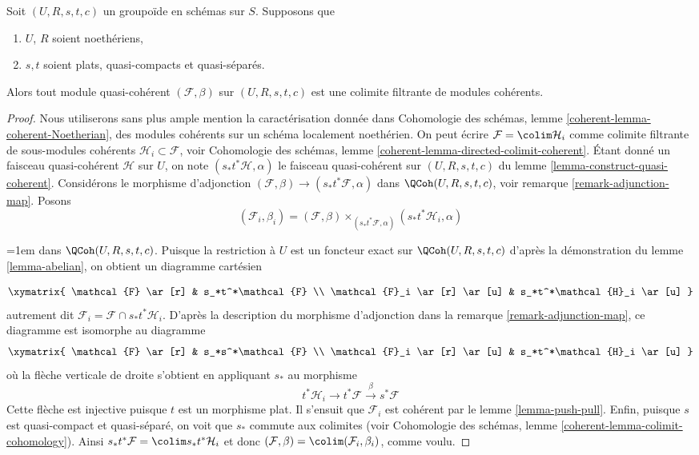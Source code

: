 \begin{lemma}
\label{lemma-colimit-coherent}
Soit $(U, R, s, t, c)$ un groupoïde en schémas sur $S$.
Supposons que
\begin{enumerate}
\item $U$, $R$ soient noethériens,
\item $s, t$ soient plats, quasi-compacts et quasi-séparés.
\end{enumerate}
Alors tout module quasi-cohérent $(\mathcal{F}, \beta)$ sur $(U, R, s, t, c)$
est une colimite filtrante de modules cohérents.
\end{lemma}

\begin{proof}
Nous utiliserons sans plus ample mention la caractérisation donnée dans
Cohomologie des schémas, lemme \ref{coherent-lemma-coherent-Noetherian}, des
modules cohérents sur un schéma localement noethérien. On peut écrire
$\mathcal{F} = \colim \mathcal{H}_i$ comme colimite filtrante
de sous-modules cohérents $\mathcal{H}_i \subset \mathcal{F}$, voir
Cohomologie des schémas, lemme \ref{coherent-lemma-directed-colimit-coherent}.
Étant donné un faisceau quasi-cohérent $\mathcal{H}$ sur $U$, on note
$(s_*t^*\mathcal{H}, \alpha)$ le faisceau quasi-cohérent sur $(U, R, s, t, c)$ du
lemme \ref{lemma-construct-quasi-coherent}. Considérons le morphisme d'adjonction
$(\mathcal{F}, \beta) \to (s_*t^*\mathcal{F}, \alpha)$ dans
$\QCoh(U, R, s, t, c)$, voir remarque \ref{remark-adjunction-map}.
Posons
$$
(\mathcal{F}_i, \beta_i) =
(\mathcal{F}, \beta)
\times_{(s_*t^*\mathcal{F}, \alpha)}
(s_*t^*\mathcal{H}_i, \alpha)
$$
{\emergencystretch=1em dans $\QCoh(U,\allowbreak R,\allowbreak s,\allowbreak t,\allowbreak c)$. Puisque la restriction à $U$ est un foncteur exact
sur $\QCoh(U,\allowbreak R,\allowbreak s,\allowbreak t,\allowbreak c)$ d'après la démonstration du lemme \ref{lemma-abelian},
on obtient un diagramme cartésien\par}
$$
\xymatrix{
\mathcal{F} \ar[r] & s_*t^*\mathcal{F} \\
\mathcal{F}_i \ar[r] \ar[u] & s_*t^*\mathcal{H}_i \ar[u]
}
$$
autrement dit $\mathcal{F}_i = \mathcal{F} \cap s_*t^*\mathcal{H}_i$.
D'après la description du morphisme d'adjonction dans la remarque \ref{remark-adjunction-map},
ce diagramme est isomorphe au diagramme
$$
\xymatrix{
\mathcal{F} \ar[r] & s_*s^*\mathcal{F} \\
\mathcal{F}_i \ar[r] \ar[u] & s_*t^*\mathcal{H}_i \ar[u]
}
$$
où la flèche verticale de droite s'obtient en appliquant $s_*$ au morphisme
$$
t^*\mathcal{H}_i \to t^*\mathcal{F} \xrightarrow{\beta} s^*\mathcal{F}
$$
Cette flèche est injective puisque $t$ est un morphisme plat. Il s'ensuit que
$\mathcal{F}_i$ est cohérent par le lemme \ref{lemma-push-pull}.
Enfin, puisque $s$ est quasi-compact et quasi-séparé, on voit que
$s_*$ commute aux colimites (voir
Cohomologie des schémas, lemme \ref{coherent-lemma-colimit-cohomology}).
Ainsi $s_*t^*\mathcal{F} = \colim s_*t^*\mathcal{H}_i$ et donc
$(\mathcal{F}, \beta) = \colim (\mathcal{F}_i, \beta_i)$, comme voulu.
\end{proof}

